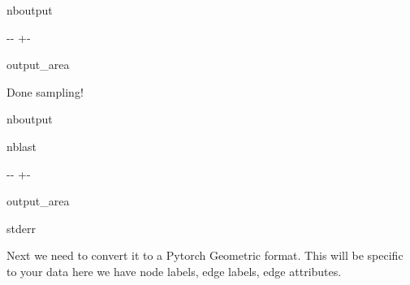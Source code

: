 \documentclass[letterpaper,10pt,english]{sphinxhowto}
\begin{document}
\begin{sphinxuseclass}{nboutput}
{

\kern-\sphinxverbatimsmallskipamount\kern-\baselineskip
\kern+\FrameHeightAdjust\kern-\fboxrule
\vspace{\nbsphinxcodecellspacing}

\begin{sphinxuseclass}{output_area}
\begin{sphinxuseclass}{}


\begin{sphinxVerbatim}[commandchars=\\\{\}]
Done sampling!

\end{sphinxVerbatim}



\end{sphinxuseclass}
\end{sphinxuseclass}
}

\end{sphinxuseclass}
\begin{sphinxuseclass}{nboutput}
\begin{sphinxuseclass}{nblast}
{

\kern-\sphinxverbatimsmallskipamount\kern-\baselineskip
\kern+\FrameHeightAdjust\kern-\fboxrule
\vspace{\nbsphinxcodecellspacing}

\begin{sphinxuseclass}{output_area}
\begin{sphinxuseclass}{stderr}


\begin{sphinxVerbatim}[commandchars=\\\{\}]

\end{sphinxVerbatim}

\end{sphinxuseclass}
\end{sphinxuseclass}
}

\end{sphinxuseclass}
\end{sphinxuseclass}
\sphinxAtStartPar
Next we need to convert it to a Pytorch Geometric format. This will be specific to your data \sphinxhyphen{} here we have node labels, edge labels, edge attributes.
\end{document}

